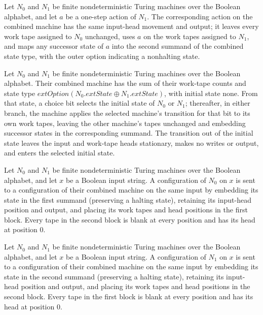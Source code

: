\begin{definition}
\leanok
{}
Let $N_0$ and $N_1$ be finite nondeterministic Turing machines over the Boolean
alphabet, and let $a$ be a one-step action of $N_1$. The corresponding action on the
combined machine has the same input-head movement and output; it leaves every work tape
assigned to $N_0$ unchanged, uses $a$ on the work tapes assigned to $N_1$, and maps any
successor state of $a$ into the second summand of the combined state type, with the
outer option indicating a nonhalting state.
\end{definition}

\begin{definition}
\label{Turing.FinNDTM.coinBranch}
\leanok
{}
Let $N_0$ and $N_1$ be finite nondeterministic Turing machines over the Boolean
alphabet. Their combined machine has the sum of their work-tape counts and state type
$	ext{Option}(N_0.	ext{State} \oplus N_1.	ext{State})$, with initial state none. From
that state, a choice bit selects the initial state of $N_0$ or $N_1$; thereafter, in
either branch, the machine applies the selected machine's transition for that bit to its
own work tapes, leaving the other machine's tapes unchanged and embedding successor
states in the corresponding summand. The transition out of the initial state leaves the
input and work-tape heads stationary, makes no writes or output, and enters the selected
initial state.
\end{definition}

\begin{definition}
\leanok
{}
Let $N_0$ and $N_1$ be finite nondeterministic Turing machines over the Boolean
alphabet, and let $x$ be a Boolean input string. A configuration of $N_0$ on $x$ is sent
to a configuration of their combined machine on the same input by embedding its state in
the first summand (preserving a halting state), retaining its input-head position and
output, and placing its work tapes and head positions in the first block. Every tape in
the second block is blank at every position and has its head at position $0$.
\end{definition}

\begin{definition}
\leanok
{}
Let $N_0$ and $N_1$ be finite nondeterministic Turing machines over the Boolean
alphabet, and let $x$ be a Boolean input string. A configuration of $N_1$ on $x$ is sent
to a configuration of their combined machine on the same input by embedding its state in
the second summand (preserving a halting state), retaining its input-head position and
output, and placing its work tapes and head positions in the second block. Every tape in
the first block is blank at every position and has its head at position $0$.
\end{definition}

